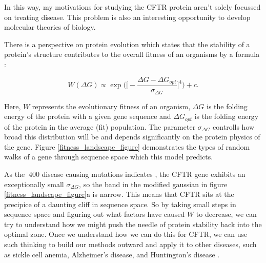 In this way, my motivations for studying the CFTR protein aren't solely focussed on treating disease. This problem is also an interesting opportunity to develop molecular theories of biology. 

There is a perspective on protein evolution which states that the stability of a protein's structure contributes to the overall fitness of an organisms by a formula \cite{depristo2005}:

\begin{equation}
	\label{fitness_equation}
	W(\Delta G) \propto \exp\bigg(\bigg[-\frac{\Delta G - \Delta G_{opt}}{\sigma_{\Delta G}}\bigg]^4\bigg) + c.
\end{equation}

Here, $W$ represents the evolutionary fitness of an organism, $\Delta G$ is the folding energy of the protein with a given gene sequence and $\Delta G_{opt}$ is the folding energy of the protein in the average (fit) population. The parameter $\sigma_{\Delta G}$ controlls how broad this distribution will be and depends significantly on the protein physics of the gene. Figure \ref{fitness_landscape_figure} demonstrates the types of random walks of a gene through sequence space which this model predicts. 

As the $\>400$ disease causing mutations indicates \cite{cftr2}, the CFTR gene exhibits an exceptionally small $\sigma_{\Delta G}$, so the band in the modified gaussian in figure \ref{fitness_landscape_figure}a is narrow. This means that CFTR sits at the precipice of a daunting cliff in sequence space.  So by taking small steps in sequence space and figuring out what factors have caused $W$ to decrease, we can try to understand how we might push the needle of protein stability back into the optimal zone. Once we understand how we can do this for CFTR, we can use such thinking to build our methods outward and apply it to other diseases, such as sickle cell anemia, Alzheimer's disease, and Huntington's disease \cite{depristo2005}.

